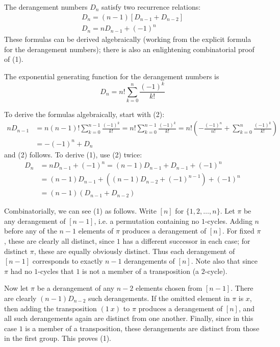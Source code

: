 \documentclass[12pt]{article}
\begin{document}
The derangement numbers $D_n$ satisfy two recurrence relations:
\begin{gather}
	D_n = (n-1)[D_{n-1}+D_{n-2}] \\
	D_n = nD_{n-1} + (-1)^n
\end{gather}
These formulas can be derived algebraically (working from the explicit formula for the derangement numbers); there is also an enlightening combinatorial proof of (1).

The exponential generating function for  the derangement numbers is
\[
	D_n = n!\sum_{k=0}^n \frac{(-1)^k}{k!}
\]

To derive the formulas algebraically, start with (2):
\begin{align*}
  nD_{n-1} &= n(n-1)!\sum_{k=0}^{n-1} \frac{(-1)^k}{k!} = n!\sum_{k=0}^{n-1} \frac{(-1)^k}{k!} 
      = n!\left(-\frac{(-1)^n}{n!} + \sum_{k=0}^n \frac{(-1)^k}{k!}\right) \\
     &= -(-1)^n + D_n
\end{align*}
and (2) follows. To derive (1), use (2) twice:
\begin{align*}
  D_n &= nD_{n-1} + (-1)^n = (n-1)D_{n-1} + D_{n-1} + (-1)^n \\
     &= (n-1)D_{n-1} + ((n-1)D_{n-2} + (-1)^{n-1}) + (-1)^n \\
     &= (n-1)(D_{n-1} + D_{n-2})
\end{align*}

Combinatorially, we can see (1) as follows. Write $[n]$ for $\{1,2,\dotsc,n\}$. Let $\pi$ be any derangement of $[n-1]$, i.e. a permutation containing no $1$-cycles. Adding $n$ before any of the $n-1$ elements of $\pi$ produces a derangement of $[n]$. For fixed $\pi$, these are clearly all distinct, since $1$ has a different successor in each case; for distinct $\pi$, these are equally obviously distinct. Thus each derangement of $[n-1]$ corresponds to exactly $n-1$ derangements of $[n]$. Note also that since $\pi$ had no $1$-cycles that $1$ is not a member of a transposition (a $2$-cycle). 

Now let $\pi$ be a derangement of any $n-2$ elements chosen from $[n-1]$. There are clearly $(n-1)D_{n-2}$ such derangements. If the omitted element in $\pi$ is $x$, then adding the transposition $(1~x)$ to $\pi$ produces a derangement of $[n]$, and all such derangements again are distinct from one another. Finally, since in this case $1$ is a member of a transposition, these derangements are distinct from those in the first group. This proves (1).

\end{document}

